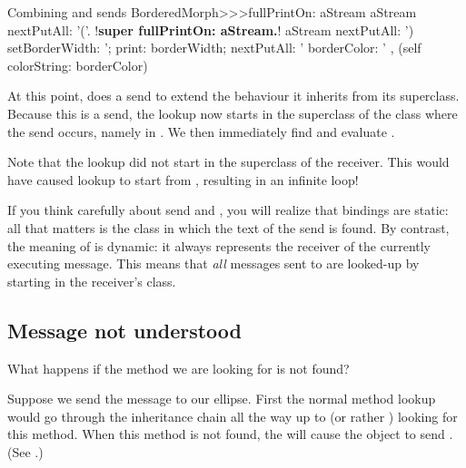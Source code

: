 \documentclass[a4paper,10pt,twoside]{book}
\begin{document}

\begin{method}[fullPrintOn]{Combining \super and \self sends}
BorderedMorph>>>fullPrintOn: aStream
	aStream nextPutAll: '('.
	!\textbf{super fullPrintOn: aStream.}!
	aStream nextPutAll: ') setBorderWidth: '; print: borderWidth;
		nextPutAll: ' borderColor: ' , (self colorString: borderColor)
\end{method}
At this point,  does a \super send to extend the 
 behaviour it inherits from its superclass.
Because this is a \super send, the lookup now starts in the superclass of the class where the \super send occurs, namely in .
We then immediately find and evaluate .

Note that the \super lookup did not start in the superclass of the receiver.
This would have caused lookup to start from , resulting in an infinite loop!


If you think carefully about \super send and , you will realize that \super bindings are static: all that matters is the class in which the text of the \super send is found.
By contrast, the meaning of \self is dynamic: it always represents the receiver of the currently executing message. This means that  \emph{all}  messages sent to \self are looked-up by starting in the receiver's class.

\subsection{Message not understood}

What happens if the method we are looking for is not found?

Suppose we send the message  to our ellipse.
First the normal method lookup would go through the inheritance chain all the way up to  (or rather ) looking for this method.
When this method is not found, the  will cause the object to send .
(See .)
\end{document}
